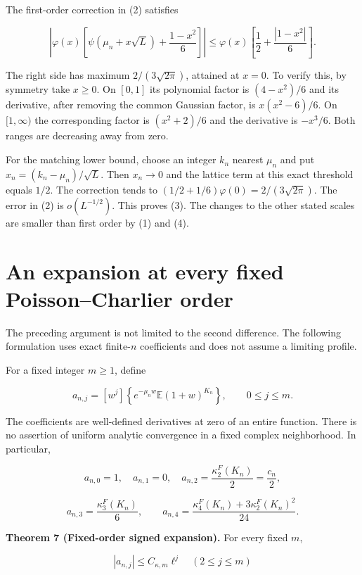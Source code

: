\documentclass[
  11pt,
]{article}
\begin{document}
The first-order correction in (2) satisfies

\[
\left|\varphi(x)\left[\psi(\mu_n+x\sqrt L)
+\frac{1-x^2}{6}\right]\right|
\le\varphi(x)\left[\frac12+\frac{|1-x^2|}{6}\right].
\]

The right side has maximum \(2/(3\sqrt{2\pi})\), attained at \(x=0\). To
verify this, by symmetry take \(x\ge0\). On \([0,1]\) its polynomial
factor is \((4-x^2)/6\) and its derivative, after removing the common
Gaussian factor, is \(x(x^2-6)/6\). On \([1,\infty)\) the corresponding
factor is \((x^2+2)/6\) and the derivative is \(-x^3/6\). Both ranges
are decreasing away from zero.

For the matching lower bound, choose an integer \(k_n\) nearest
\(\mu_n\) and put \(x_n=(k_n-\mu_n)/\sqrt L\). Then \(x_n\to0\) and the
lattice term at this exact threshold equals \(1/2\). The correction
tends to \((1/2+1/6)\varphi(0)=2/(3\sqrt{2\pi})\). The error in (2) is
\(o(L^{-1/2})\). This proves (3). The changes to the other stated scales
are smaller than first order by (1) and (4).

\section{An expansion at every fixed Poisson--Charlier
order}\label{an-expansion-at-every-fixed-poissoncharlier-order}

The preceding argument is not limited to the second difference. The
following formulation uses exact finite-\(n\) coefficients and does not
assume a limiting profile.

For a fixed integer \(m\ge1\), define

\[
a_{n,j}=[w^j]\left\{e^{-\mu_n w}\mathbb E(1+w)^{K_n}\right\},
\qquad 0\le j\le m.
\]

The coefficients are well-defined derivatives at zero of an entire
function. There is no assertion of uniform analytic convergence in a
fixed complex neighborhood. In particular,

\[
a_{n,0}=1,\quad a_{n,1}=0,\quad
a_{n,2}=\frac{\kappa_2^F(K_n)}2=\frac{c_n}{2},
\]

\[
a_{n,3}=\frac{\kappa_3^F(K_n)}6,
\qquad
a_{n,4}=\frac{\kappa_4^F(K_n)+3\kappa_2^F(K_n)^2}{24}.
\]


\textbf{Theorem 7 (Fixed-order signed expansion).} For every fixed
\(m\),

\[
|a_{n,j}|\le C_{\kappa,m}\ell^j\quad(2\le j\le m)
\]
\end{document}
